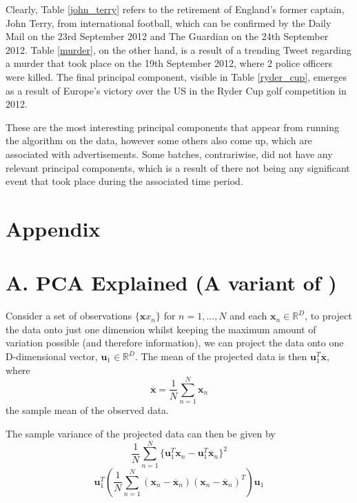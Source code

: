 \documentclass[11pt,a4paper]{article}
\begin{document}
Clearly, Table \ref{john_terry} refers to the retirement of England's former captain, John Terry, from international football, which can be confirmed by the Daily Mail on the 23rd September 2012 and The Guardian on the 24th September 2012. Table \ref{murder}, on the other hand, is a result of a trending Tweet regarding a murder that took place on the 19th September 2012, where 2 police officers were killed. The final principal component, visible in Table \ref{ryder_cup}, emerges as a result of Europe's victory over the US in the Ryder Cup golf competition in 2012. 

These are the most interesting principal components that appear from running the algorithm on the data, however some others also come up, which are associated with advertisements. Some batches, contrariwise, did not have any relevant principal components, which is a result of there not being any significant event that took place during the associated time period.

\clearpage


\clearpage

\section*{Appendix}\label{appendixa}

\appendix
{}

\section*{A. PCA Explained (A variant of \cite{bishop})}

Consider a set of observations $\{\mathbf{x}x_n\}$ for $n = 1, ..., N$ and each $\mathbf{x}_n \in \mathbb{R}^D$, to project the data onto just one dimension whilst keeping the maximum amount of variation possible (and therefore information), we can project the data onto one D-dimensional vector, $\mathbf{u}_1 \in \mathbb{R}^D$. The mean of the projected data is then $\mathbf{u}_1^T \mathbf{\overline{x}}$, where
\begin{equation*}
\mathbf{\overline{x}} = \frac{1}{N} \sum_{n = 1}^N \mathbf{x}_n 
\end{equation*} 
the sample mean of the observed data.

The sample variance of the projected data can then be given by
\begin{equation*}
\frac{1}{N} \sum_{n = 1}^N \{\mathbf{u}_1^T\mathbf{x}_n -  \mathbf{u}_1^T\mathbf{\overline{x}}_n\}^2
\end{equation*} 
\begin{equation*}
\mathbf{u}_1^T \left( \frac{1}{N} \sum_{n = 1}^N \left(\mathbf{x}_n - \mathbf{\overline{x}}_n\right)\left(\mathbf{x}_n - \mathbf{\overline{x}}_n\right)^T \right) \mathbf{u}_1
\end{equation*} 
\end{document}
